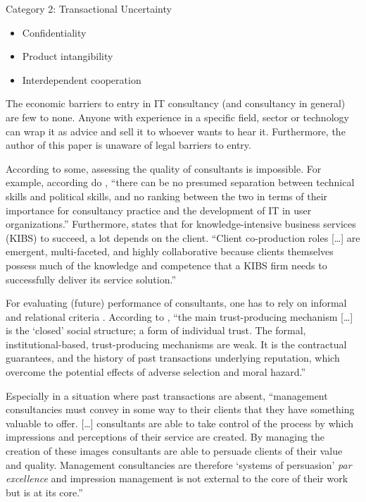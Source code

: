 \documentclass[12pt]{article}
\providecommand{\tightlist}{%
  \setlength{\itemsep}{0pt}\setlength{\parskip}{0pt}}
\begin{document}
Category 2: Transactional Uncertainty

\begin{itemize}
\tightlist
\item
  Confidentiality
\item
  Product intangibility
\item
  Interdependent cooperation
\end{itemize}

The economic barriers to entry \citep[ 463]{fee2004} in IT consultancy
(and consultancy in general) are few to none. Anyone with experience in
a specific field, sector or technology can wrap it as advice and sell it
to whoever wants to hear it. Furthermore, the author of this paper is
unaware of legal barriers to entry.

According to some, assessing the quality of consultants is impossible.
For example, according do \citet[40]{bloomfield1995}, ``there can be no
presumed separation between technical skills and political skills, and
no ranking between the two in terms of their importance for consultancy
practice and the development of IT in user organizations.'' Furthermore,
\citet[101-102]{bettencourt2002} states that for knowledge-intensive
business services (KIBS) to succeed, a lot depends on the client.
``Client co-production roles {[}\ldots{]} are emergent, multi-faceted,
and highly collaborative because clients themselves possess much of the
knowledge and competence that a KIBS firm needs to successfully deliver
its service solution.''

For evaluating (future) performance of consultants, one has to rely on
informal and relational criteria \citep[ 277]{wright2002}. According to
\citet[250]{clark1993}, ``the main trust-producing mechanism
{[}\ldots{]} is the `closed' social structure; a form of individual
trust. The formal, institutional-based, trust-producing mechanisms are
weak. It is the contractual guarantees, and the history of past
transactions underlying reputation, which overcome the potential effects
of adverse selection and moral hazard.''

Especially in a situation where past transactions are absent,
``management consultancies must convey in some way to their clients that
they have something valuable to offer. {[}\ldots{]} consultants are able
to take control of the process by which impressions and perceptions of
their service are created. By managing the creation of these images
consultants are able to persuade clients of their value and quality.
Management consultancies are therefore `systems of persuasion' \emph{par
excellence} and impression management is not external to the core of
their work but is at its core.'' \citep[ 35]{clark1998}
\end{document}
